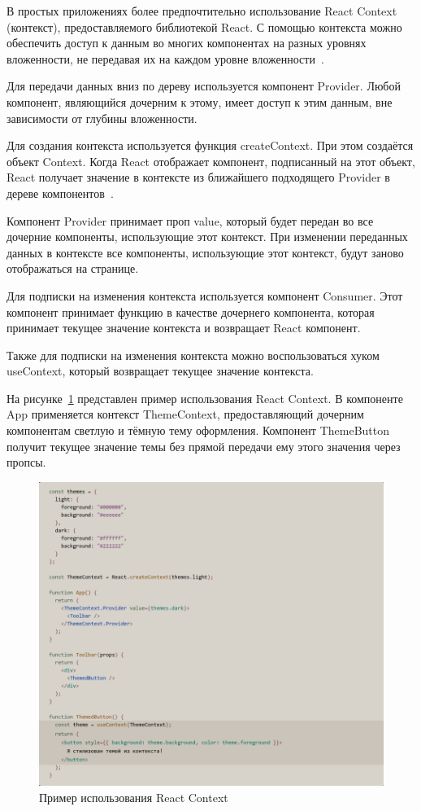 В простых приложениях более предпочтительно использование React Con\-text (контекст), предоставляемого библиотекой React. С помощью контекста можно обеспечить доступ к данным во многих компонентах на разных уровнях вложенности, не передавая их на каждом уровне вложенности~\cite{react}.

Для передачи данных вниз по дереву используется компонент Provider. Любой компонент, являющийся дочерним к этому, имеет доступ к этим данным, вне зависимости от глубины вложенности.

Для создания контекста используется функция createContext. При этом создаётся объект Context. Когда React отображает компонент, подписанный на этот объект, React получает значение в контексте из ближайшего подходящего Provider в дереве компонентов~\cite{react}.

Компонент Provider принимает проп value, который будет передан во все дочерние компоненты, использующие этот контекст. При изменении переданных данных в контексте все компоненты, использующие этот контекст, будут заново отображаться на странице.

Для подписки на изменения контекста используется компонент Consumer. Этот компонент принимает функцию в качестве дочернего компонента, которая принимает текущее значение контекста и возвращает React компонент.

Также для подписки на изменения контекста можно воспользоваться хуком useContext, который возвращает текущее значение контекста.

На рисунке~\ref{img:react__context} представлен пример использования React Context. В компоненте App применяется контекст ThemeContext, предоставляющий дочерним компонентам светлую и тёмную тему оформления. Компонент ThemeButton получит текущее значение темы без прямой передачи ему этого значения через пропсы.

\begin{figure}[H]
  \centering
  \includegraphics[height=0.4\textheight]{assets/images/theoretical2/react_context.png}
  \caption{Пример использования React Context}
  \label{img:react__context}
\end{figure}

